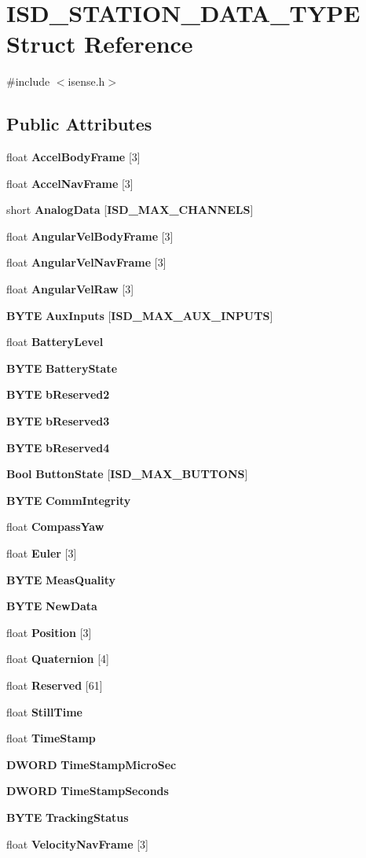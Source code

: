 \section{\-I\-S\-D\-\_\-\-S\-T\-A\-T\-I\-O\-N\-\_\-\-D\-A\-T\-A\-\_\-\-T\-Y\-P\-E \-Struct \-Reference}
\label{structISD__STATION__DATA__TYPE}


{\ttfamily \#include $<$isense.\-h$>$}

\subsection*{\-Public \-Attributes}
\begin{DoxyCompactItemize}
\item 
float {\bf \-Accel\-Body\-Frame} [3]
\item 
float {\bf \-Accel\-Nav\-Frame} [3]
\item 
short {\bf \-Analog\-Data} [{\bf \-I\-S\-D\-\_\-\-M\-A\-X\-\_\-\-C\-H\-A\-N\-N\-E\-L\-S}]
\item 
float {\bf \-Angular\-Vel\-Body\-Frame} [3]
\item 
float {\bf \-Angular\-Vel\-Nav\-Frame} [3]
\item 
float {\bf \-Angular\-Vel\-Raw} [3]
\item 
{\bf \-B\-Y\-T\-E} {\bf \-Aux\-Inputs} [{\bf \-I\-S\-D\-\_\-\-M\-A\-X\-\_\-\-A\-U\-X\-\_\-\-I\-N\-P\-U\-T\-S}]
\item 
float {\bf \-Battery\-Level}
\item 
{\bf \-B\-Y\-T\-E} {\bf \-Battery\-State}
\item 
{\bf \-B\-Y\-T\-E} {\bf b\-Reserved2}
\item 
{\bf \-B\-Y\-T\-E} {\bf b\-Reserved3}
\item 
{\bf \-B\-Y\-T\-E} {\bf b\-Reserved4}
\item 
{\bf \-Bool} {\bf \-Button\-State} [{\bf \-I\-S\-D\-\_\-\-M\-A\-X\-\_\-\-B\-U\-T\-T\-O\-N\-S}]
\item 
{\bf \-B\-Y\-T\-E} {\bf \-Comm\-Integrity}
\item 
float {\bf \-Compass\-Yaw}
\item 
float {\bf \-Euler} [3]
\item 
{\bf \-B\-Y\-T\-E} {\bf \-Meas\-Quality}
\item 
{\bf \-B\-Y\-T\-E} {\bf \-New\-Data}
\item 
float {\bf \-Position} [3]
\item 
float {\bf \-Quaternion} [4]
\item 
float {\bf \-Reserved} [61]
\item 
float {\bf \-Still\-Time}
\item 
float {\bf \-Time\-Stamp}
\item 
{\bf \-D\-W\-O\-R\-D} {\bf \-Time\-Stamp\-Micro\-Sec}
\item 
{\bf \-D\-W\-O\-R\-D} {\bf \-Time\-Stamp\-Seconds}
\item 
{\bf \-B\-Y\-T\-E} {\bf \-Tracking\-Status}
\item 
float {\bf \-Velocity\-Nav\-Frame} [3]
\end{DoxyCompactItemize}


